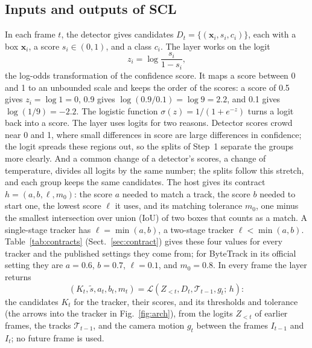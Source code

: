 \documentclass[pdflatex,sn-mathphys-num,iicol]{sn-jnl}
\begin{document}
\subsection{Inputs and outputs of SCL}\label{sec:problem}
In each frame $t$, the detector gives candidates $D_t=\{(\mathbf{x}_i,s_i,c_i)\}$, each with a box
$\mathbf{x}_i$, a score $s_i\in(0,1)$, and a class $c_i$. The layer works on the logit
\begin{equation}
z_i=\log\frac{s_i}{1-s_i},
\label{eq:logit}
\end{equation}
the log-odds transformation of the confidence score. It maps a score between 0 and 1 to an
unbounded scale and keeps the order of the scores: a score of 0.5 gives $z_i=\log1=0$, 0.9 gives
$\log(0.9/0.1)=\log9=2.2$, and 0.1 gives $\log(1/9)=-2.2$. The logistic function $\sigma(z)=1/(1+e^{-z})$ turns a logit back into a
score. The layer uses logits for two reasons. Detector scores crowd near 0 and 1, where small
differences in score are large differences in confidence; the logit spreads these regions out, so
the splits of Step~1 separate the groups more clearly. And a common change of a detector's scores,
a change of temperature, divides all logits by the same number; the splits follow this stretch,
and each group keeps the same candidates. The host gives its contract $h=(a,b,\ell,m_0)$: the score $a$ needed to match a track, the
score $b$ needed to start one, the lowest score $\ell$ it uses, and its matching tolerance $m_0$,
one minus the smallest intersection over union (IoU) of two boxes that counts as a match. A
single-stage tracker has $\ell=\min(a,b)$, a two-stage tracker $\ell<\min(a,b)$. Table~\ref{tab:contracts}
(Sect.~\ref{sec:contract}) gives these four values for every tracker and the published settings they
come from; for ByteTrack in its official setting they are $a=0.6$, $b=0.7$, $\ell=0.1$, and
$m_0=0.8$. In every frame
the layer returns
\begin{equation}
\left(K_t,\tilde{s},a_t,b_t,m_t\right)=
\mathcal{L}\left(Z_{<t},D_t,\mathcal{T}_{t-1},g_t;\,h\right):
\label{eq:layer}
\end{equation}
the candidates $K_t$ for the tracker, their scores, and its thresholds and tolerance (the arrows
into the tracker in Fig.~\ref{fig:arch}), from the logits $Z_{<t}$ of earlier frames, the tracks
$\mathcal{T}_{t-1}$, and the camera motion $g_t$ between the frames $I_{t-1}$ and $I_t$; no future
frame is used.
\end{document}
